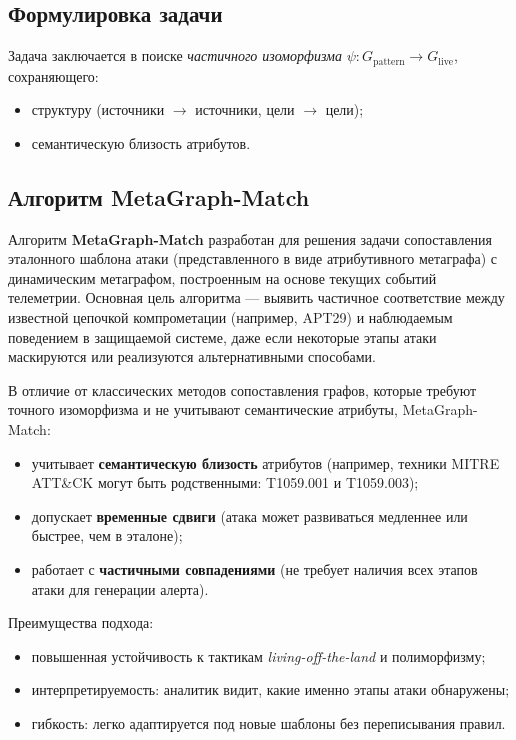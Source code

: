 \subsection{Формулировка задачи}

Задача заключается в поиске \textit{частичного изоморфизма} $\psi: G_{\text{pattern}} \rightarrow G_{\text{live}}$, сохраняющего:

\noindent
\begin{itemize}
    \item структуру (источники $\rightarrow$ источники, цели $\rightarrow$ цели);
    \item семантическую близость атрибутов.
\end{itemize}
\subsection{Алгоритм MetaGraph-Match}

Алгоритм \textbf{MetaGraph-Match} разработан для решения задачи сопоставления эталонного шаблона атаки (представленного в виде атрибутивного метаграфа) с динамическим метаграфом, построенным на основе текущих событий телеметрии. Основная цель алгоритма — выявить частичное соответствие между известной цепочкой компрометации (например, APT29) и наблюдаемым поведением в защищаемой системе, даже если некоторые этапы атаки маскируются или реализуются альтернативными способами.

В отличие от классических методов сопоставления графов, которые требуют точного изоморфизма и не учитывают семантические атрибуты, MetaGraph-Match:

\noindent
\begin{itemize}
    \item учитывает \textbf{семантическую близость} атрибутов (например, техники MITRE ATT\&CK могут быть родственными: T1059.001 и T1059.003);
    \item допускает \textbf{временные сдвиги} (атака может развиваться медленнее или быстрее, чем в эталоне);
    \item работает с \textbf{частичными совпадениями} (не требует наличия всех этапов атаки для генерации алерта).
\end{itemize}

Преимущества подхода:

\noindent
\begin{itemize}
    \item повышенная устойчивость к тактикам \textit{living-off-the-land} и полиморфизму;
    \item интерпретируемость: аналитик видит, какие именно этапы атаки обнаружены;
    \item гибкость: легко адаптируется под новые шаблоны без переписывания правил.
\end{itemize}

